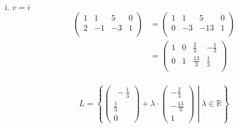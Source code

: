 \documentclass{article}
\begin{document}
\begin{enumerate}[(i)]
\begin{align*}
    \right) \\
    &=
    \left(
    \begin{array}{cccc|c}
      1  & 0 & 0 & 0 & \frac{11}{37} \\
      0  & 1 & 0 & 0 & \frac{6}{37} \\
      0  & 0 & 1 & 0 & \frac{2}{37} \\
      0  & 0 & 0 & 1 & \frac{4}{37} \\
    \end{array}
    \right) \\
  \end{align*}
  \[
    L = \left\{\begin{pmatrix}\frac{11}{37} \\ \frac{6}{37} \\ \frac{2}{37} \\ \frac{4}{37} \end{pmatrix}\right\}
  \]

  Es existiert genau eine Lösung. Damit ist $1_2$ als Linearkombination der Vektoren darstellbar und diese Darstellung ist eindeutig.
  
\item $v = i$
  \begin{align*}
    \left(
    \begin{array}{ccc|c}
      1 & 1  & 5  & 0 \\
      2 & -1 & -3 & 1 \\
    \end{array}
    \right)
    &=
    \left(
    \begin{array}{ccc|c}
      1 & 1  & 5   & 0 \\
      0 & -3 & -13 & 1 \\
    \end{array}
    \right) \\
    &=
    \left(
    \begin{array}{ccc|c}
      1 & 0 & \frac{2}{3}  & -\frac{1}{3} \\
      0 & 1 & \frac{13}{3} & \frac{1}{3} \\
    \end{array}
    \right) \\
  \end{align*}

  \[
    L = \left\{
      \begin{pmatrix}\
        -\frac{1}{3} \\
        \frac{1}{3} \\
        0
      \end{pmatrix}
      + \lambda \cdot
      \begin{pmatrix}
        -\frac{2}{3} \\
        -\frac{13}{3} \\
        1
      \end{pmatrix}
      \middle| \lambda \in \mathbb{R} \right\}
  \]


\end{enumerate}
\end{document}
